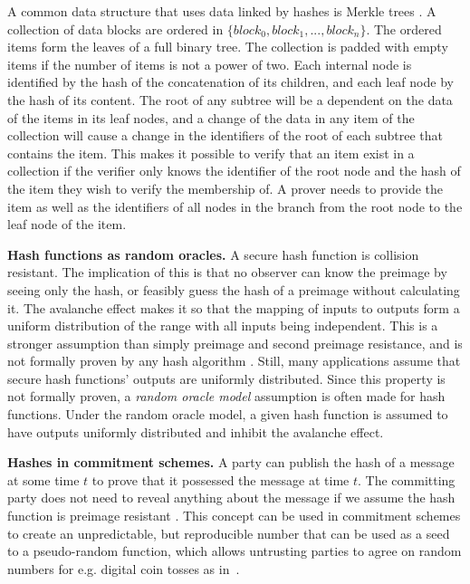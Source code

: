 A common data structure that uses data linked by hashes is Merkle trees \cite{merkle_digital_1988}. A collection of data blocks are ordered in $\{block_0, block_1, ..., block_n\}$. The ordered items form the leaves of a full binary tree. The collection is padded with empty items if the number of items is not a power of two. Each internal node is identified by the hash of the concatenation of its children, and each leaf node by the hash of its content. The root of any subtree will be a dependent on the data of the items in its leaf nodes, and a change of the data in any item of the collection will cause a change in the identifiers of the root of each subtree that contains the item. 
This makes it possible to verify that an item exist in a collection if the verifier only knows the identifier of the root node and the hash of the item they wish to verify the membership of. A prover needs to provide the item as well as the identifiers of all nodes in the branch from the root node to the leaf node of the item. 

\noindent
{\bf Hash functions as random oracles.}
A secure hash function is collision resistant. The implication of this is that no observer can know the preimage by seeing only the hash, or feasibly guess the hash of a preimage without calculating it. The avalanche effect makes it so that the mapping of inputs to outputs form a uniform distribution of the range with all inputs being independent. This is a stronger assumption than simply preimage and second preimage resistance, and is not formally proven by any hash algorithm \cite[p.~179-181]{lindell2014introduction}. Still, many applications assume that secure hash functions' outputs are uniformly distributed. Since this property is not formally proven, a \emph{random oracle model} assumption is often made for hash functions. Under the random oracle model, a given hash function is assumed to have outputs uniformly distributed and inhibit the avalanche effect.

\noindent
{\bf Hashes in commitment schemes.}
A party can publish the hash of a message at some time $t$ to prove that it possessed the message at time $t$. The committing party does not need to reveal anything about the message if we assume the hash function is preimage resistant \cite[p.~187--189]{lindell2014introduction}. This concept can be used in commitment schemes \cite{brassard1988minimum} to create an unpredictable, but reproducible number that can be used as a seed to a pseudo-random function, which allows untrusting parties to agree on random numbers for e.g. digital coin tosses as in~\cite{blum1983coin}.

